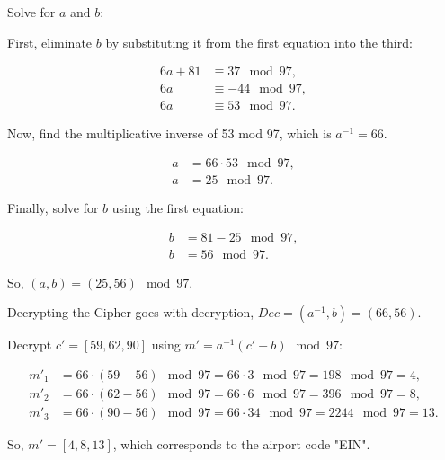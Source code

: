 \documentclass{article}
\begin{document}
Solve for \( a \) and \( b \):

First, eliminate \( b \) by substituting it from the first equation into the third:

\[
  \begin{aligned}
    6a + 81 &\equiv 37 \mod 97, \\
    6a &\equiv -44 \mod 97, \\
    6a &\equiv 53 \mod 97.
  \end{aligned}
\]

Now, find the multiplicative inverse of 53 mod 97, which is \( a^{-1} = 66 \).

\[
  \begin{aligned}
    a &= 66 \cdot 53 \mod 97, \\
    a &= 25 \mod 97.
  \end{aligned}
\]

Finally, solve for \( b \) using the first equation:

\[
  \begin{aligned}
    b &= 81 - 25 \mod 97, \\
    b &= 56 \mod 97.
  \end{aligned}
\]

So, \( (a, b) = (25, 56) \mod 97 \).

Decrypting the Cipher goes with decryption, \( Dec = (a^{-1}, b) = (66, 56) \).

Decrypt \( c' = [59, 62, 90] \) using \( m' = a^{-1}(c' - b) \mod 97 \):

\[
  \begin{aligned}
    m'_1 &= 66 \cdot (59 - 56) \mod 97 = 66 \cdot 3 \mod 97 = 198 \mod 97 = 4, \\
    m'_2 &= 66 \cdot (62 - 56) \mod 97 = 66 \cdot 6 \mod 97 = 396 \mod 97 = 8, \\
    m'_3 &= 66 \cdot (90 - 56) \mod 97 = 66 \cdot 34 \mod 97 = 2244 \mod 97 = 13.
  \end{aligned}
\]

So, \( m' = [4, 8, 13] \), which corresponds to the airport code "EIN".
\end{document}
